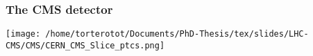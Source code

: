 \begin{frame}
\frametitle{The CMS detector}
\begin{center}
\texttt{[image: /home/torterotot/Documents/PhD-Thesis/tex/slides/LHC-CMS/CMS/CERN\_CMS\_Slice\_ptcs.png]}
\end{center}
\end{frame}
